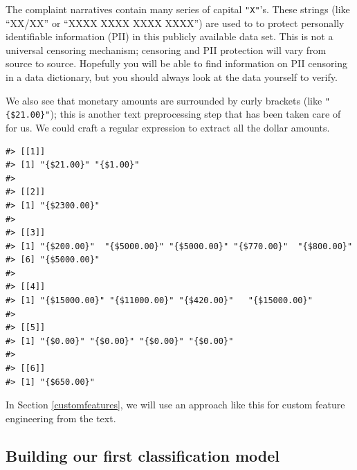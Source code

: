 \documentclass[
]{krantz}
\makeatletter
\newenvironment{Shaded}{\begin{snugshade}}{\end{snugshade}}
\newcommand{\FunctionTok}[1]{\textcolor[rgb]{0.00,0.00,0.00}{#1}}
\newcommand{\NormalTok}[1]{#1}
\newcommand{\SpecialCharTok}[1]{\textcolor[rgb]{0.00,0.00,0.00}{#1}}
\newcommand{\StringTok}[1]{\textcolor[rgb]{0.31,0.60,0.02}{#1}}
\newenvironment{kframe}{%
\medskip{}
\setlength{\fboxsep}{.8em}
 \def\at@end@of@kframe{}%
 \ifinner\ifhmode%
  \def\at@end@of@kframe{\end{minipage}}%
  \begin{minipage}{\columnwidth}%
 \fi\fi%
 \def\FrameCommand##1{\hskip\@totalleftmargin \hskip-\fboxsep
 \colorbox{shadecolor}{##1}\hskip-\fboxsep
     \hskip-\linewidth \hskip-\@totalleftmargin \hskip\columnwidth}%
 \MakeFramed {\advance\hsize-\width
   \@totalleftmargin\z@ \linewidth\hsize
   \@setminipage}}%
 {\par\unskip\endMakeFramed%
 \at@end@of@kframe}
\renewenvironment{Shaded}{\begin{kframe}}{\end{kframe}}
\makeatother
\begin{document}
The complaint narratives contain many series of capital \texttt{"X"}'s. These strings (like ``XX/XX'' or ``XXXX XXXX XXXX XXXX'') are used to to protect personally identifiable information (PII) in this publicly available data set. This is not a universal censoring mechanism; censoring and PII protection will vary from source to source. Hopefully you will be able to find information on PII censoring in a data dictionary, but you should always look at the data yourself to verify.

We also see that monetary amounts are surrounded by curly brackets (like \texttt{"\{\$21.00\}"}); this is another text preprocessing step that has been taken care of for us. We could craft a regular expression to extract all the dollar amounts.

\begin{Shaded}
\end{Shaded}

\begin{verbatim}
#> [[1]]
#> [1] "{$21.00}" "{$1.00}" 
#> 
#> [[2]]
#> [1] "{$2300.00}"
#> 
#> [[3]]
#> [1] "{$200.00}"  "{$5000.00}" "{$5000.00}" "{$770.00}"  "{$800.00}" 
#> [6] "{$5000.00}"
#> 
#> [[4]]
#> [1] "{$15000.00}" "{$11000.00}" "{$420.00}"   "{$15000.00}"
#> 
#> [[5]]
#> [1] "{$0.00}" "{$0.00}" "{$0.00}" "{$0.00}"
#> 
#> [[6]]
#> [1] "{$650.00}"
\end{verbatim}

In Section \ref{customfeatures}, we will use an approach like this for custom feature engineering from the text.

\hypertarget{classfirstmodel}{%
\subsection{Building our first classification model}\label{classfirstmodel}}
\end{document}
